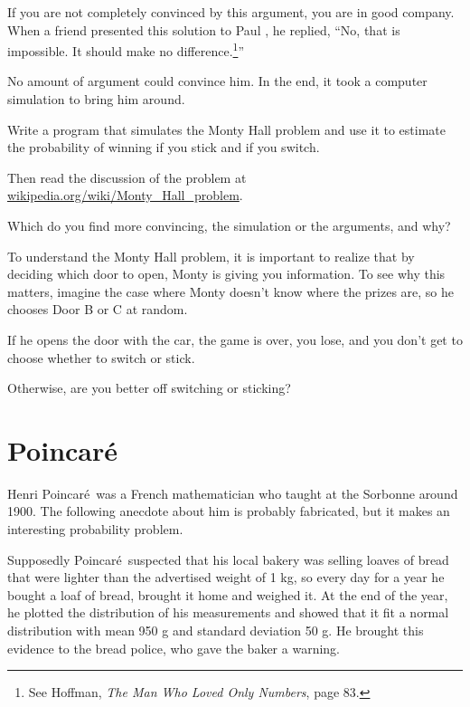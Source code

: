 \documentclass[12pt]{book}
\begin{document}
If you are not completely convinced by this argument, you are
in good company.  When a friend presented this solution to
Paul \Erdos, he replied, ``No, that is impossible.  It should
make no difference.\footnote{See Hoffman, {\em The Man Who Loved
Only Numbers}, page 83.}''

No amount of argument could convince him.  In the end, it took
a computer simulation to bring him around.

\begin{exercise}
Write a program that simulates the Monty Hall problem and use
it to estimate the probability of winning if you stick and if
you switch.

Then read the discussion of the problem at
\url{wikipedia.org/wiki/Monty_Hall_problem}.

Which do you find more convincing, the simulation or the arguments,
and why?

\end{exercise}


\begin{exercise}
To understand the Monty Hall problem, it is important to realize
that by deciding which door to open, Monty is giving you information.
To see why this matters, imagine the case where Monty doesn't
know where the prizes are, so he chooses Door B or C at random.

If he opens the door with the car, the game is over, you lose, and
you don't get to choose whether to switch or stick.

Otherwise, are you better off switching or sticking?

\end{exercise}



\newcommand{\Poincare}{Poincar\'{e}}

\section{\Poincare}

Henri \Poincare~was a French mathematician who taught at the Sorbonne
around 1900.  The following anecdote about him is probably fabricated,
but it makes an interesting probability problem.

Supposedly \Poincare~suspected that his local bakery was selling
loaves of bread that were lighter than the advertised weight of 1 kg,
so every day for a year he bought a loaf of bread, brought it home and
weighed it.  At the end of the year, he plotted the distribution of
his measurements and showed that it fit a normal distribution with
mean 950 g and standard deviation 50 g.  He brought this evidence to
the bread police, who gave the baker a warning.
\end{document}
